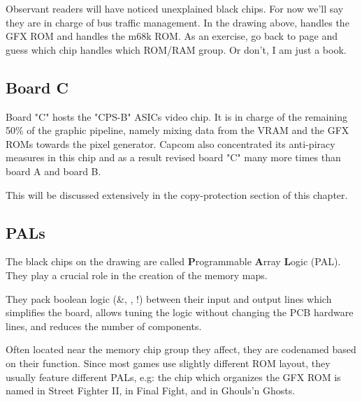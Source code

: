 
Observant readers will have noticed unexplained black chips. For now we'll say they are in charge of bus traffic management. In the drawing above,  handles the GFX ROM and  handles the m68k ROM. As an exercise, go back to page \pageref{fig:drawboarda} and guess which chip handles which ROM/RAM group. Or don't, I am just a book.

\subsection{Board C}
Board "C" hosts the "CPS-B" ASICs video chip. It is in charge of the remaining 50\% of the graphic pipeline, namely mixing data from the VRAM and the GFX ROMs towards the pixel generator. Capcom also concentrated its anti-piracy measures in this chip and as a result revised board "C" many more times than board A and board B. 

This will be discussed extensively in the copy-protection section of this chapter.

\begin{minipage}[t]{0.49\linewidth}
\end{minipage}%
\hfill%
\begin{minipage}[t]{0.49\linewidth}
\end{minipage}



\subsection{PALs}
The black chips on the drawing are called \textbf{P}rogrammable \textbf{A}rray \textbf{L}ogic (PAL). They play a crucial role in the creation of the memory maps. 

They pack boolean logic (\&, \textbar, !) between their input and output lines which simplifies the board, allows tuning the logic without changing the PCB hardware lines, and reduces the number of components.


 Often located near the memory chip group they affect, they are codenamed based on their function. Since most games use slightly different ROM layout, they usually feature different PALs, e.g: the chip which organizes the GFX ROM is named  in Street Fighter II,  in Final Fight, and  in Ghouls'n Ghosts.



